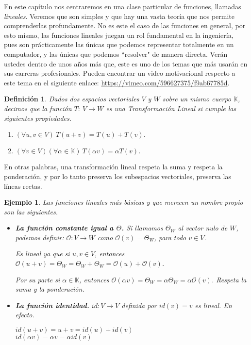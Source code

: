 \documentclass[12pt]{book}
\newtheorem{defi}{Definici\'on}
\newtheorem{ejem}{Ejemplo}
\def\K{\mathbb{K}}
\begin{document}
En este capítulo nos centraremos en una clase particular de funciones, llamadas \emph{lineales}.
Veremos que son simples y que hay una vasta teoría que nos permite comprenderlas profundamente.
No es este el caso de las funciones en general, por esto mismo, las funciones lineales juegan un rol fundamental en la ingeniería, pues son prácticamente las únicas que podemos representar totalmente en un computador, y las únicas que podemos ``resolver" de manera directa.
Verán ustedes dentro de unos años más que, este es uno de los temas que más usarán en sus carreras profesionales.
Pueden encontrar un video motivacional respecto a este tema en el siguiente enlace: \url{https://vimeo.com/596627375/f9ab67785d}.

\begin{defi}
Dados dos espacios vectoriales $V$ y $W$ sobre un mismo cuerpo $\K$, decimos que la función $T:\ V\rightarrow W$ es una \emph{Transformación Lineal}  si cumple las siguientes propiedades.
\begin{enumerate}
\item $(\forall u,v\in V)\ T(u+v)=T(u)+T(v)$.
\item $(\forall v\in V)(\forall \alpha \in \K)\ T(\alpha v)=\alpha T(v)$.
\end{enumerate}
\end{defi}
En otras palabras, una transformación lineal respeta la suma y respeta la ponderación, y por lo tanto preserva los subespacios vectoriales, preserva las líneas rectas.

\bigskip


\begin{ejem}
Las funciones lineales más básicas y que merecen un nombre propio son las siguientes.
\begin{itemize}
\item {\bf La función constante igual a $\Theta$.} Si llamamos $\Theta_W$ al vector nulo de $W$, podemos definir: $\mathcal{O}:V\rightarrow W$ como $\mathcal{O}(v)=\Theta_W$, para todo $v\in V$.

Es lineal ya que si $u,v\in V$, entonces $\mathcal{O}(u+v)=\Theta_W=\Theta_W+\Theta_W=\mathcal{O}(u)+\mathcal{O}(v)$.

Por su parte si $\alpha \in \K$, entonces $\mathcal{O}(\alpha v)=\Theta_W=\alpha\Theta_W=\alpha\mathcal{O}(v)$. Respeta la suma y la ponderación.

\item {\bf La función identidad.} $id:V\rightarrow V$ definida por $id(v)=v$ es lineal. En efecto.

$id(u+v)=u+v=id(u)+id(v)$\\
$id(\alpha v)=\alpha v=\alpha id(v)$
\end{itemize}
\end{ejem}
\end{document}
